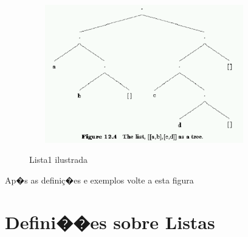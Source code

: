 \documentclass[final,a4paper]{article}
\begin{document}
\begin{figure}[!htb]
\centering
\includegraphics[height=6cm, width=10cm]{figuras/listas_1.pdf}
\label{fig_listas_1}
\caption{Lista1  ilustrada}
\end{figure}
\begin{center}
 \textsf{ Ap�s as defini\c{c}�es e 
exemplos volte a esta figura}
\end{center}


\section{Defini��es sobre Listas}
\end{document}
